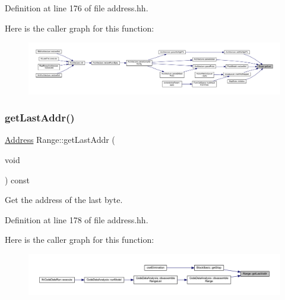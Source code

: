 Definition at line 176 of file address.\+hh.

Here is the caller graph for this function\+:
\nopagebreak
\begin{figure}[H]
\begin{center}
\leavevmode
\includegraphics[width=350pt]{class_range_afbcec6b1a5499f299dc8ff7d078cd83c_icgraph}
\end{center}
\end{figure}
\mbox{\label{class_range_a1fdc16eafa7a33a122ad682822c7d7d1}} 
\subsubsection{\texorpdfstring{getLastAddr()}{getLastAddr()}}
{\footnotesize\ttfamily \mbox{\hyperlink{class_address}{Address}} Range\+::get\+Last\+Addr (\begin{DoxyParamCaption}\item[{void}]{ }\end{DoxyParamCaption}) const\hspace{0.3cm}{\ttfamily [inline]}}



Get the address of the last byte. 



Definition at line 178 of file address.\+hh.

Here is the caller graph for this function\+:
\nopagebreak
\begin{figure}[H]
\begin{center}
\leavevmode
\includegraphics[width=350pt]{class_range_a1fdc16eafa7a33a122ad682822c7d7d1_icgraph}
\end{center}
\end{figure}
\mbox{\label{class_range_af5cc1b4a92034ab87269b25950f0fe8f}} 

